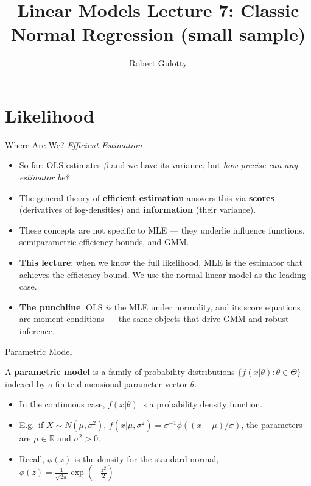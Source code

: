 \documentclass[aspectratio=169, handout, t]{beamer}
\title[PLSC 30700]{Linear Models Lecture 7: Classic Normal Regression (small sample)}
\author{Robert Gulotty}
\institute[Chicago]{University of Chicago}
\numberwithin{equation}{section}
\begin{document}
\begin{frame}
\maketitle
\end{frame}

\section{Likelihood}

\setcounter{subsection}{1}

\begin{frame}{Where Are We? \emph{Efficient Estimation}}
\begin{itemize}
\item So far: OLS estimates $\beta$ and we have its variance, but \emph{how precise can any estimator be?}\pause
\item The general theory of \textbf{efficient estimation} answers this via \textbf{scores} (derivatives of log-densities) and \textbf{information} (their variance).\pause
\item These concepts are not specific to MLE --- they underlie influence functions, semiparametric efficiency bounds, and GMM.\pause
\item \textbf{This lecture}: when we know the full likelihood, MLE is the estimator that achieves the efficiency bound.  We use the normal linear model as the leading case.\pause
\item \textbf{The punchline}: OLS \emph{is} the MLE under normality, and its score equations are moment conditions --- the same objects that drive GMM and robust inference.
\end{itemize}
\end{frame}



\begin{frame}{Parametric Model}
\begin{definition}
A \textbf{parametric model} is a family of probability distributions $\{f(x|\theta):\theta\in\Theta\}$ indexed by a finite-dimensional parameter vector $\theta$.
\end{definition}\pause
\begin{itemize}
\item In the continuous case, $f(x|\theta)$ is a probability density function.\pause
\item E.g.\ if $X\sim N(\mu,\sigma^2)$, $f(x|\mu,\sigma^2)=\sigma^{-1}\phi((x-\mu)/\sigma)$, the parameters are $\mu\in \mathbb{R}$ and $\sigma^2>0$.
\item Recall, $\phi(z)$ is the density for the standard normal, $\phi(z)=\frac{1}{\sqrt{2\pi}}\exp(-\frac{z^2}{2})$
\end{itemize}
\end{frame}
\end{document}
